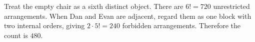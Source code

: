 Treat the empty chair as a sixth distinct object. There are $6!=720$ unrestricted arrangements. When Dan and Evan are adjacent, regard them as one block with two internal orders, giving $2\cdot5!=240$ forbidden arrangements. Therefore the count is $\boxed{480}$.
